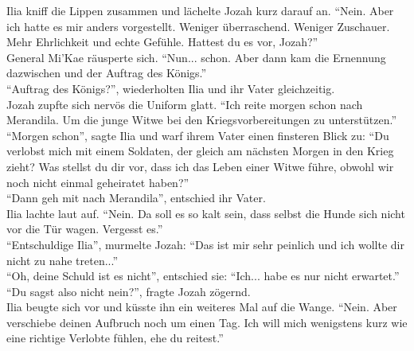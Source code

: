 Ilia kniff die Lippen zusammen und lächelte Jozah kurz darauf an. ``Nein. Aber ich hatte es mir 
anders vorgestellt. Weniger überraschend. Weniger Zuschauer. Mehr Ehrlichkeit und echte Gefühle. 
Hattest du es vor, Jozah?''\\
General Mi'Kae räusperte sich. ``Nun... schon. Aber dann kam die Ernennung dazwischen und der 
Auftrag des Königs.''\\
``Auftrag des Königs?'', wiederholten Ilia und ihr Vater gleichzeitig.\\
Jozah zupfte sich nervös die Uniform glatt. ``Ich reite morgen schon nach Merandila. Um die junge 
Witwe bei den Kriegsvorbereitungen zu unterstützen.''\\
``Morgen schon'', sagte Ilia und warf ihrem Vater einen finsteren Blick zu: ``Du verlobst mich mit 
einem Soldaten, der gleich am nächsten Morgen in den Krieg zieht? Was stellst du dir vor, dass ich 
das Leben einer Witwe führe, obwohl wir noch nicht einmal geheiratet haben?''\\
``Dann geh mit nach Merandila'', entschied ihr Vater.\\
Ilia lachte laut auf. ``Nein. Da soll es so kalt sein, dass selbst die Hunde sich nicht vor die Tür 
wagen. Vergesst es.''\\
``Entschuldige Ilia'', murmelte Jozah: ``Das ist mir sehr peinlich und ich wollte dir nicht zu nahe 
treten...''\\
``Oh, deine Schuld ist es nicht'', entschied sie: ``Ich... habe es nur nicht erwartet.''\\
``Du sagst also nicht nein?'', fragte Jozah zögernd.\\
Ilia beugte sich vor und küsste ihn ein weiteres Mal auf die Wange. ``Nein. Aber verschiebe deinen 
Aufbruch noch um einen Tag. Ich will mich wenigstens kurz wie eine richtige Verlobte fühlen, 
ehe du reitest.''\\




 
